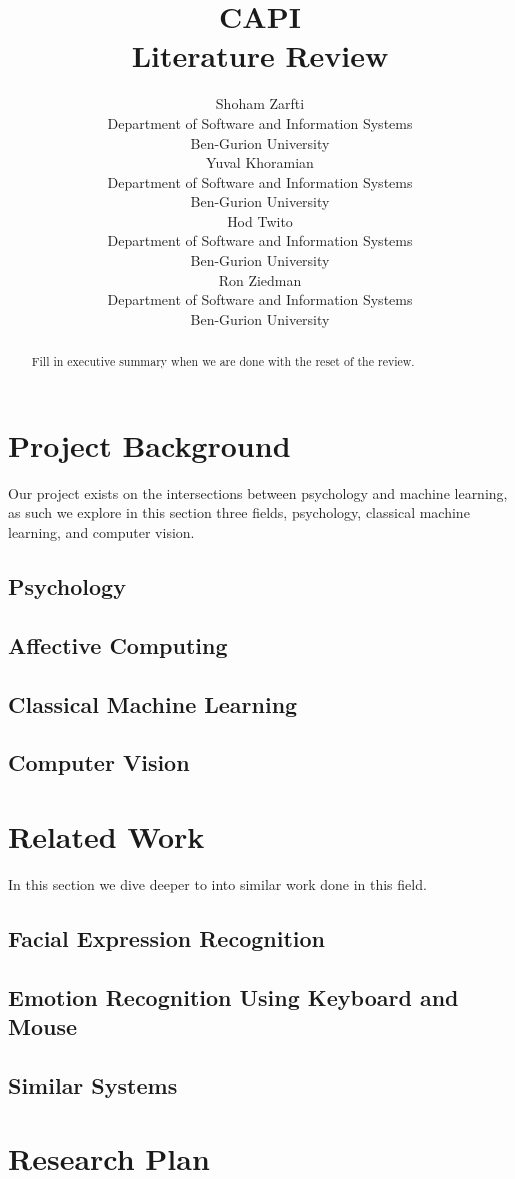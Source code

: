 \documentclass{article}
\title{CAPI \\ Literature Review}
\author{
  Shoham Zarfti \\
  Department of Software and Information Systems \\
  Ben-Gurion University \\
   \And
 Yuval Khoramian \\
  Department of Software and Information Systems\\
  Ben-Gurion University \\
  \And
 Hod Twito \\
  Department of Software and Information Systems\\
  Ben-Gurion University \\
  \And
 Ron Ziedman \\
  Department of Software and Information Systems\\
  Ben-Gurion University \\
}
\begin{document}
\maketitle
\begin{abstract}
Fill in executive summary when we are done with the reset of the review.
\end{abstract}



\section{Project Background}
Our project exists on the intersections between psychology and machine learning, as such we explore in this section three fields, psychology, classical machine learning, and computer vision.

\subsection{Psychology}


\subsection{Affective Computing}


\subsection{Classical Machine Learning}



\subsection{Computer Vision}



\section{Related Work}
In this section we dive deeper to into similar work done in this field.

\subsection{Facial Expression Recognition}


\subsection{Emotion Recognition Using Keyboard and Mouse}



\subsection{Similar Systems}



\section{Research Plan}




  

\end{document}
